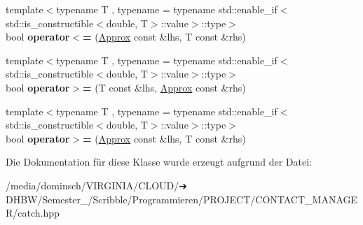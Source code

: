 \begin{DoxyCompactItemize}
\item 
\mbox{\label{classCatch_1_1Detail_1_1Approx_a6040b908588745570847d7ae8483b091}} 
{\footnotesize template$<$typename T , typename  = typename std\+::enable\+\_\+if$<$std\+::is\+\_\+constructible$<$double, T$>$\+::value$>$\+::type$>$ }\\bool {\bfseries operator$<$=} (\hyperlink{classCatch_1_1Detail_1_1Approx}{Approx} const \&lhs, T const \&rhs)
\item 
\mbox{\label{classCatch_1_1Detail_1_1Approx_affd27efc62be386daeecb7a09e828d44}} 
{\footnotesize template$<$typename T , typename  = typename std\+::enable\+\_\+if$<$std\+::is\+\_\+constructible$<$double, T$>$\+::value$>$\+::type$>$ }\\bool {\bfseries operator$>$=} (T const \&lhs, \hyperlink{classCatch_1_1Detail_1_1Approx}{Approx} const \&rhs)
\item 
\mbox{\label{classCatch_1_1Detail_1_1Approx_a5899b8a36725406701e2ebded2971ee6}} 
{\footnotesize template$<$typename T , typename  = typename std\+::enable\+\_\+if$<$std\+::is\+\_\+constructible$<$double, T$>$\+::value$>$\+::type$>$ }\\bool {\bfseries operator$>$=} (\hyperlink{classCatch_1_1Detail_1_1Approx}{Approx} const \&lhs, T const \&rhs)
\end{DoxyCompactItemize}


Die Dokumentation für diese Klasse wurde erzeugt aufgrund der Datei\+:\begin{DoxyCompactItemize}
\item 
/media/dominsch/\+V\+I\+R\+G\+I\+N\+I\+A/\+C\+L\+O\+U\+D/➔ D\+H\+B\+W/\+Semester\+\_/\+Scribble/\+Programmieren/\+P\+R\+O\+J\+E\+C\+T/\+C\+O\+N\+T\+A\+C\+T\+\_\+\+M\+A\+N\+A\+G\+E\+R/catch.\+hpp\end{DoxyCompactItemize}
